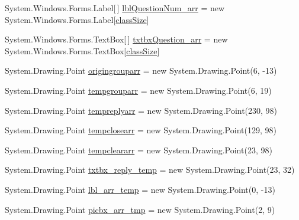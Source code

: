 \begin{DoxyCompactItemize}
\item 
\-System.\-Windows.\-Forms.\-Label\mbox{[}$\,$\mbox{]} \hyperlink{class_sr_p___classroom_inq_1_1frm_classrrom_inq_ae46e928c386c686caa96bfe4f302c2f1}{lbl\-Question\-Num\-\_\-arr} = new \-System.\-Windows.\-Forms.\-Label\mbox{[}\hyperlink{class_sr_p___classroom_inq_1_1frm_classrrom_inq_a78d9aab335edfe53d39036b9d89928a8}{class\-Size}\mbox{]}
\item 
\-System.\-Windows.\-Forms.\-Text\-Box\mbox{[}$\,$\mbox{]} \hyperlink{class_sr_p___classroom_inq_1_1frm_classrrom_inq_ac8b5f7f10341c6c43066881afcbbcaaa}{txtbx\-Question\-\_\-arr} = new \-System.\-Windows.\-Forms.\-Text\-Box\mbox{[}\hyperlink{class_sr_p___classroom_inq_1_1frm_classrrom_inq_a78d9aab335edfe53d39036b9d89928a8}{class\-Size}\mbox{]}
\item 
\-System.\-Drawing.\-Point \hyperlink{class_sr_p___classroom_inq_1_1frm_classrrom_inq_ace01ba3289e75624d67b90f742c195f5}{origingrouparr} = new \-System.\-Drawing.\-Point(6, -\/13)
\item 
\-System.\-Drawing.\-Point \hyperlink{class_sr_p___classroom_inq_1_1frm_classrrom_inq_a6c8231644b9d1f92d08f110b003d621e}{tempgrouparr} = new \-System.\-Drawing.\-Point(6, 19)
\item 
\-System.\-Drawing.\-Point \hyperlink{class_sr_p___classroom_inq_1_1frm_classrrom_inq_ac6007ba00a6fab2fca4b74c0e588e850}{tempreplyarr} = new \-System.\-Drawing.\-Point(230, 98)
\item 
\-System.\-Drawing.\-Point \hyperlink{class_sr_p___classroom_inq_1_1frm_classrrom_inq_a6ad2bdb537cfc35b174dd16dd8e03904}{tempclosearr} = new \-System.\-Drawing.\-Point(129, 98)
\item 
\-System.\-Drawing.\-Point \hyperlink{class_sr_p___classroom_inq_1_1frm_classrrom_inq_a189c01a3745fca62a8250be6a3517894}{tempcleararr} = new \-System.\-Drawing.\-Point(23, 98)
\item 
\-System.\-Drawing.\-Point \hyperlink{class_sr_p___classroom_inq_1_1frm_classrrom_inq_a0b175596cb83997b38795ee916c978f1}{txtbx\-\_\-reply\-\_\-temp} = new \-System.\-Drawing.\-Point(23, 32)
\item 
\-System.\-Drawing.\-Point \hyperlink{class_sr_p___classroom_inq_1_1frm_classrrom_inq_ae3405b23105270490b9685ac52e1b574}{lbl\-\_\-arr\-\_\-temp} = new \-System.\-Drawing.\-Point(0, -\/13)
\item 
\-System.\-Drawing.\-Point \hyperlink{class_sr_p___classroom_inq_1_1frm_classrrom_inq_a019be294be5d02bea4369298d2a135db}{picbx\-\_\-arr\-\_\-tmp} = new \-System.\-Drawing.\-Point(2, 9)

\end{DoxyCompactItemize}
